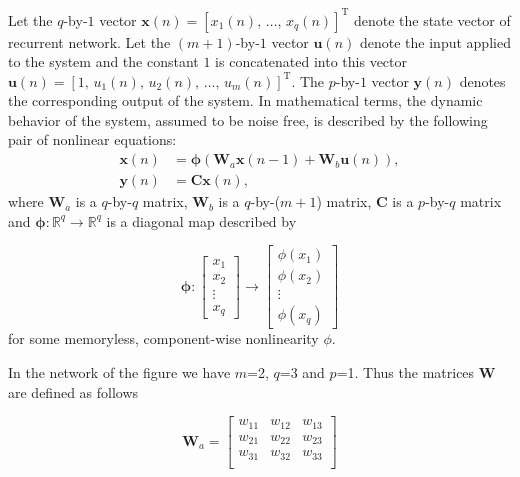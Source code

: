 \begin{enumerate}
\begin{solution}
\begin{enumerate}
      Let the $q$-by-$1$ vector
      $\mathbf{x}(n)=[x_1(n),\,\ldots,\,x_q(n)]^{\mathrm{T}}$ denote
      the state vector of recurrent network. Let the $(m+1)$-by-$1$
      vector $\mathbf{u}(n)$ denote the input applied to the system
      and the constant $1$ is concatenated into this vector
      $\mathbf{u}(n)=[1,\,u_1(n),\,u_2(n),\,\ldots,\,u_m(n)]^{\mathrm{T}}$.
      The $p$-by-$1$ vector $\mathbf{y}(n)$ denotes the corresponding
      output of the system.  In mathematical terms, the dynamic
      behavior of the system, assumed to be noise free, is described
      by the following pair of nonlinear equations:
      \begin{align*}
        \mathbf{x}(n) &= \boldsymbol\phi \left( \mathbf{W}_a \mathbf{x}(n-1) +
          \mathbf{W}_b \mathbf{u}(n) \right), \\
        \mathbf{y}(n) &= \mathbf{C} \mathbf{x}(n),
      \end{align*}
      where $\mathbf{W}_a$ is a $q$-by-$q$ matrix, $\mathbf{W}_b$ is a
      $q$-by-($m+1$) matrix, $\mathbf{C}$ is a $p$-by-$q$ matrix and
      $\boldsymbol\phi: \mathbb{R}^q \rightarrow \mathbb{R}^q$ is a diagonal map
      described by

      \[
      \boldsymbol{\phi}:
      \left[\begin{array}{c}
          x_1 \\
          x_2 \\
          \vdots \\
          x_q
        \end{array}\right]
      \rightarrow
      \left[\begin{array}{c}
          \phi(x_1) \\
          \phi(x_2) \\
          \vdots \\
          \phi(x_q)
        \end{array}\right]
      \]
      for some memoryless, component-wise nonlinearity $\phi$.

      In the network of the figure we have $m$=2, $q$=3 and $p$=1. Thus the
      matrices $\mathbf{W}$ are defined as follows

      \[
      \mathbf{W}_a = 
      \left[\begin{array}{ccc}
          w_{11} & w_{12} & w_{13} \\
          w_{21} & w_{22} & w_{23} \\
          w_{31} & w_{32} & w_{33} \\
        \end{array}\right]
      \]


\end{enumerate}
\end{solution}
\end{enumerate}
